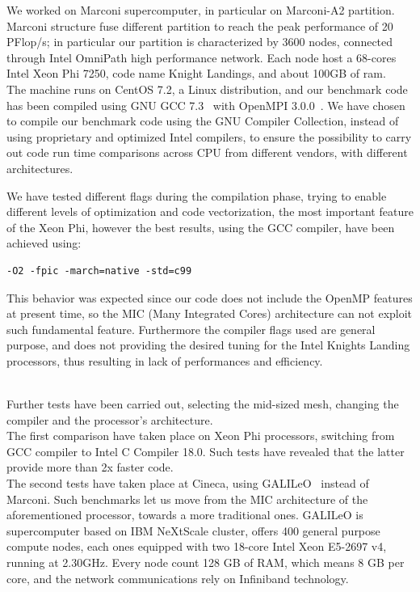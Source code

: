 We worked on Marconi\cite{marconi:specs} supercomputer, in particular on Marconi-A2 partition.
Marconi structure fuse different partition to reach the peak performance of 20 PFlop/s; in particular our partition is characterized by 3600 nodes, connected through Intel OmniPath\cite{intel:intelmpivsopenmpi} high performance network. Each node host a 68-cores Intel Xeon Phi 7250, code name Knight Landings, and about 100GB of ram. \\
The machine runs on CentOS 7.2, a Linux distribution, and our benchmark code has been compiled using GNU GCC 7.3~\cite{gcc} with OpenMPI 3.0.0~\cite{openmpi}\cite{MPI:standard3}. We have chosen to compile our benchmark code using the GNU Compiler Collection, instead of using proprietary and optimized Intel compilers, to ensure the possibility to carry out code run time comparisons across CPU from different vendors, with different architectures. 
\par
We have tested different flags during the compilation phase, trying to enable different levels of optimization and code vectorization, the most important feature of the Xeon Phi, however the best results, using the GCC compiler, have been achieved using:
\begin{lstlisting}
-O2 -fpic -march=native -std=c99
\end{lstlisting}
This behavior was expected since our code does not include the OpenMP\cite{openmp} features at present time, so the MIC\cite{mic} (Many Integrated Cores) architecture can not exploit such fundamental feature. Furthermore the compiler flags used are general purpose, and does not providing the desired tuning for the Intel Knights Landing processors, thus resulting in lack of performances and efficiency.\\~\par

Further tests have been carried out, selecting the mid-sized mesh, changing the compiler and the processor's architecture.\\
The first comparison have taken place on Xeon Phi processors, switching from GCC compiler to Intel C Compiler 18.0. Such tests have revealed that the latter provide more than 2x faster code. \\
The second tests have taken place at Cineca, using GALILeO~\cite{galileo:specs} instead of Marconi. Such benchmarks let us move from the MIC architecture of the aforementioned processor, towards a more traditional ones.
GALILeO is supercomputer based on IBM NeXtScale cluster, offers 400 general purpose compute nodes, each ones equipped with two 18-core Intel Xeon E5-2697 v4, running at 2.30GHz. Every node count 128 GB of RAM, which means 8 GB per core, and the network communications rely on Infiniband technology.


